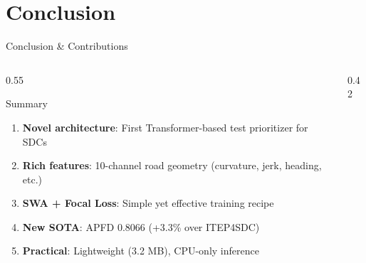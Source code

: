 \documentclass[aspectratio=169, 11pt]{beamer}
\begin{document}
\section{Conclusion}

\begin{frame}{Conclusion \& Contributions}
\begin{columns}[T]
\begin{column}{0.55\textwidth}
  \begin{block}{Summary}
    \begin{enumerate}
      \item \textbf{Novel architecture}: First Transformer-based test prioritizer for SDCs
      \item \textbf{Rich features}: 10-channel road geometry (curvature, jerk, heading, etc.)
      \item \textbf{SWA + Focal Loss}: Simple yet effective training recipe
      \item \textbf{New SOTA}: APFD 0.8066 (+3.3\% over ITEP4SDC)
      \item \textbf{Practical}: Lightweight (3.2 MB), CPU-only inference
    \end{enumerate}
  \end{block}
\end{column}
\begin{column}{0.42\textwidth}
  \centering
\end{column}
\end{columns}
\end{frame}
\end{document}
